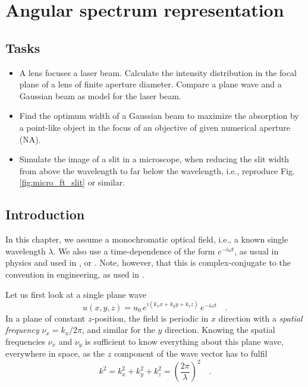 \renewcommand{\lastmod}{January 14, 2022}
\renewcommand{\chapterauthors}{Markus Lippitz}


\chapter{Angular spectrum representation}

\section{Tasks}

\begin{itemize}

\item A lens focuses a laser beam. Calculate the intensity distribution in the focal plane of a lens of finite aperture diameter. Compare  a plane wave and a Gaussian beam as model for the laser beam.
        
\item Find the optimum width of a Gaussian beam to maximize the absorption by a point-like object in the focus of an objective of given numerical aperture (NA).
  
\item Simulate the image of a slit in a microscope, when reducing the slit width from above the wavelength to far below the wavelength, i.e.,  reproduce Fig. \ref{fig:micro_ft_slit} or similar.
        
\end{itemize}




\section{Introduction}

In this chapter, we assume a monochromatic optical field, i.e., a known single wavelength $\lambda$. We also use  a time-dependence of the form $e^{-i \omega t}$, as usual in physics and used in \cite{Novotny-Hecht2012}, or \cite{Goodman2005}. Note, however, that this is complex-conjugate to the convention in engineering, as used in \cite{SalehTeich1991}.

Let us first look at a single plane wave
\begin{equation}
    u(x,y,z) = u_0 \, e^{i (k_x x + k_y y + k_z z)} \, e^{-i \omega t} \quad .
\end{equation}
In a plane of constant $z$-position, the field is periodic in $x$ direction with a \emph{spatial frequency} $\nu_x = k_x / 2 \pi$, and similar for the $y$ direction. Knowing the spatial frequencies $\nu_x$ and $\nu_y$ is sufficient to know everything about this plane wave, everywhere in space, as the $z$ component of the wave vector has to fulfil 
\begin{equation}
    k^2 = k_x^2 + k_y^2 + k_z^2 = \left( \frac{2\pi}{\lambda} \right)^2 \quad .
    \label{eq:micros_ksq}
\end{equation}

